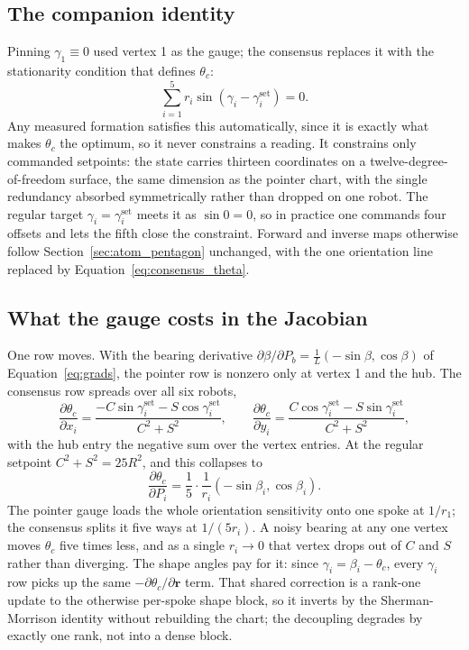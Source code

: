 \documentclass[12pt, letterpaper, oneside]{report}
\begin{document}
\subsection{The companion identity}

Pinning $\gamma_1\equiv0$ used vertex 1 as the gauge; the consensus replaces
it with the stationarity condition that defines $\theta_c$:
\begin{equation}
\sum_{i=1}^5 r_i \sin\!\left(\gamma_i - \gamma_i^{\text{set}}\right) = 0.
\label{eq:companion_identity}
\end{equation}
Any measured formation satisfies this automatically, since it is exactly
what makes $\theta_c$ the optimum, so it never constrains a reading. It
constrains only commanded setpoints: the state carries thirteen coordinates
on a twelve-degree-of-freedom surface, the same dimension as the pointer
chart, with the single redundancy absorbed symmetrically rather than
dropped on one robot. The regular target $\gamma_i=\gamma_i^{\text{set}}$
meets it as $\sin 0=0$, so in practice one commands four offsets and lets
the fifth close the constraint. Forward and inverse maps otherwise follow
Section~\ref{sec:atom_pentagon} unchanged, with the one orientation line
replaced by Equation~\eqref{eq:consensus_theta}.

\subsection{What the gauge costs in the Jacobian}

One row moves. With the bearing derivative
$\partial\beta/\partial P_b=\tfrac1L(-\sin\beta,\cos\beta)$ of
Equation~\eqref{eq:grads}, the pointer row is nonzero only at vertex 1 and
the hub. The consensus row spreads over all six robots,
\begin{equation}
\frac{\partial\theta_c}{\partial x_i} = \frac{-C\sin\gamma_i^{\text{set}} - S\cos\gamma_i^{\text{set}}}{C^2+S^2}, \qquad
\frac{\partial\theta_c}{\partial y_i} = \frac{C\cos\gamma_i^{\text{set}} - S\sin\gamma_i^{\text{set}}}{C^2+S^2},
\end{equation}
with the hub entry the negative sum over the vertex entries. At the regular
setpoint $C^2+S^2=25R^2$, and this collapses to
\begin{equation}
\frac{\partial\theta_c}{\partial P_i} = \frac{1}{5}\cdot\frac{1}{r_i}\left(-\sin\beta_i,\cos\beta_i\right).
\end{equation}
The pointer gauge loads the whole orientation sensitivity onto one spoke at
$1/r_1$; the consensus splits it five ways at $1/(5r_i)$. A noisy bearing at
any one vertex moves $\theta_c$ five times less, and as a single $r_i\to0$
that vertex drops out of $C$ and $S$ rather than diverging. The shape angles
pay for it: since $\gamma_i=\beta_i-\theta_c$, every $\gamma_i$ row picks up
the same $-\partial\theta_c/\partial\mathbf{r}$ term. That shared correction
is a rank-one update to the otherwise per-spoke shape block, so it inverts
by the Sherman-Morrison identity without rebuilding the chart; the
decoupling degrades by exactly one rank, not into a dense block.
\end{document}

